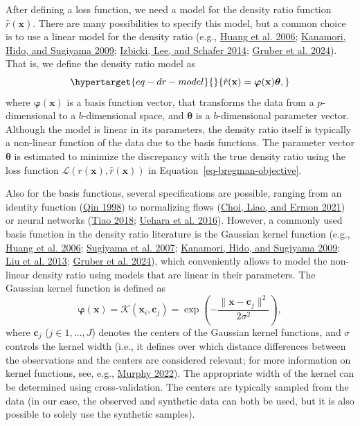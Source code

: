 \documentclass[
]{article}
\newcommand{\bx}{\mathbf{x}}
\begin{document}
After defining a loss function, we need a model for the density ratio
function \(\hat{r}(\bx)\). There are many possibilities to specify this
model, but a common choice is to use a linear model for the density
ratio (e.g., \protect\hyperlink{ref-huang_kmm_2006}{Huang et al. 2006};
\protect\hyperlink{ref-kanamori_ulsif_2009}{Kanamori, Hido, and Sugiyama
2009}; \protect\hyperlink{ref-izbicki_dre_2014}{Izbicki, Lee, and
Schafer 2014}; \protect\hyperlink{ref-gruber2024overcoming}{Gruber et
al. 2024}). That is, we define the density ratio model as
\begin{equation}\protect\hypertarget{eq-dr-model}{}{
\hat{r}(\bx) = \boldsymbol{\varphi}(\bx) \boldsymbol{\theta},
}\label{eq-dr-model}\end{equation} where \(\boldsymbol{\varphi}(\bx)\)
is a basis function vector, that transforms the data from a
\(p\)-dimensional to a \(b\)-dimensional space, and
\(\boldsymbol{\theta}\) is a \(b\)-dimensional parameter vector.
Although the model is linear in its parameters, the density ratio itself
is typically a non-linear function of the data due to the basis
functions. The parameter vector \(\boldsymbol{\theta}\) is estimated to
minimize the discrepancy with the true density ratio using the loss
function \(\mathcal{L}(r(\bx), \hat{r}(\bx))\) in
Equation~\ref{eq-bregman-objective}.

Also for the basis functions, several specifications are possible,
ranging from an identity function
(\protect\hyperlink{ref-qin_inferences_1998}{Qin 1998}) to normalizing
flows (\protect\hyperlink{ref-choi_featurized_2021}{Choi, Liao, and
Ermon 2021}) or neural networks
(\protect\hyperlink{ref-tiao2018dre}{Tiao 2018};
\protect\hyperlink{ref-uehara2016generative}{Uehara et al. 2016}).
However, a commonly used basis function in the density ratio literature
is the Gaussian kernel function (e.g.,
\protect\hyperlink{ref-huang_kmm_2006}{Huang et al. 2006};
\protect\hyperlink{ref-sugiyama_kliep_2007}{Sugiyama et al. 2007};
\protect\hyperlink{ref-kanamori_ulsif_2009}{Kanamori, Hido, and Sugiyama
2009}; \protect\hyperlink{ref-liu_change_2013}{Liu et al. 2013};
\protect\hyperlink{ref-gruber2024overcoming}{Gruber et al. 2024}), which
conveniently allows to model the non-linear density ratio using models
that are linear in their parameters. The Gaussian kernel function is
defined as \[
\boldsymbol{\varphi}(\bx) = \mathcal{K}(\bx_i, \boldsymbol{c}_j) = 
\exp\left(
- \frac{\lVert\bx - \boldsymbol{c}_j \rVert^2}{2 \sigma^2}
\right),
\] where \(\boldsymbol{c}_j\) (\(j \in 1, \dots, J\)) denotes the
centers of the Gaussian kernel functions, and \(\sigma\) controls the
kernel width (i.e., it defines over which distance differences between
the observations and the centers are considered relevant; for more
information on kernel functions, see, e.g.,
\protect\hyperlink{ref-murphy_pmlintro_2022}{Murphy 2022}). The
appropriate width of the kernel can be determined using
cross-validation. The centers are typically sampled from the data (in
our case, the observed and synthetic data can both be used, but it is
also possible to solely use the synthetic samples).
\end{document}
